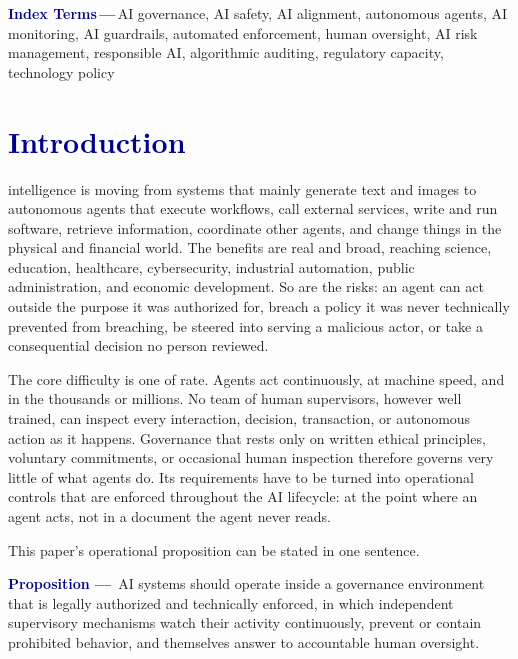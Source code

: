 \documentclass[journal]{IEEEtran}
\begin{document}
\begin{IEEEkeywords}
\begin{mdframed}[
  linecolor=darkblue!35, linewidth=0.8pt,
  backgroundcolor=darkblue!3,
  innerleftmargin=8pt, innerrightmargin=8pt,
  innertopmargin=5pt, innerbottommargin=5pt,
  roundcorner=3pt, skipabove=0pt, skipbelow=4pt, nobreak=true
]
\noindent\textbf{\textcolor{darkblue}{Index Terms\,---\,}}AI governance, AI safety, AI alignment, autonomous agents, AI monitoring, AI guardrails, automated enforcement, human oversight, AI risk management, responsible AI, algorithmic auditing, regulatory capacity, technology policy
\end{mdframed}
\end{IEEEkeywords}

\section{\textcolor{darkblue}{Introduction}}
\label{sec:intro}

 intelligence is moving from systems that mainly generate text and images to autonomous agents that execute workflows, call external services, write and run software, retrieve information, coordinate other agents, and change things in the physical and financial world. The benefits are real and broad, reaching science, education, healthcare, cybersecurity, industrial automation, public administration, and economic development. So are the risks: an agent can act outside the purpose it was authorized for, breach a policy it was never technically prevented from breaching, be steered into serving a malicious actor, or take a consequential decision no person reviewed.

The core difficulty is one of rate. Agents act continuously, at machine speed, and in the thousands or millions. No team of human supervisors, however well trained, can inspect every interaction, decision, transaction, or autonomous action as it happens. Governance that rests only on written ethical principles, voluntary commitments, or occasional human inspection therefore governs very little of what agents do. Its requirements have to be turned into operational controls that are enforced throughout the AI lifecycle: at the point where an agent acts, not in a document the agent never reads.

This paper's operational proposition can be stated in one sentence.

\begin{mdframed}[linecolor=darkblue, linewidth=1.2pt, backgroundcolor=darkblue!5,
  innerleftmargin=8pt, innerrightmargin=8pt, innertopmargin=6pt, innerbottommargin=6pt,
  roundcorner=4pt]
\noindent\textcolor{darkblue}{\bfseries Proposition ---}~AI systems should operate inside a governance environment that is legally authorized and technically enforced, in which independent supervisory mechanisms watch their activity continuously, prevent or contain prohibited behavior, and themselves answer to accountable human oversight.
\end{mdframed}
\end{document}
